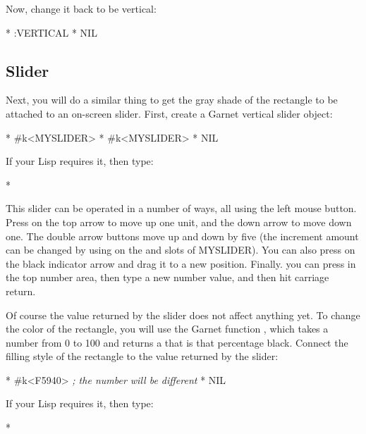 Now, change it back to be vertical:
\begin{programexample}
* 
:VERTICAL
* 
NIL
\end{programexample}

\subsection{Slider}

Next, you will do a similar thing to get the gray shade of the
rectangle to be attached to an on-screen slider.  First, create a Garnet
vertical slider object:
\begin{programexample}
* 
\#k<MYSLIDER>
* 
\#k<MYSLIDER>
* 
NIL
\end{programexample}
If your Lisp requires it, then type:
\begin{programexample}
* 
\end{programexample}

This slider can be operated in a number of ways, all using the left mouse
button.  Press on the top arrow to move up one unit, and the down arrow to
move down one.  The double arrow buttons move up and down by five (the
increment amount can be changed by using  on the
 and  slots of MYSLIDER).  You can
also press on
the black indicator arrow and drag it to a new position.  Finally. you can
press in the top number area, then type a new number value, and then hit
carriage return.

Of course the value returned by the slider does not affect anything yet.
To change the color of the rectangle, you will use the Garnet function
, which takes a number from 0 to 100 and returns a
 that is that percentage black.  Connect the filling
style of the rectangle to the value returned by the slider:

\begin{programexample}
* 
\#k<F5940>   {\it ; the number will be different}
* 
NIL
\end{programexample}
If your Lisp requires it, then type:
\begin{programexample}
* 
\end{programexample}

